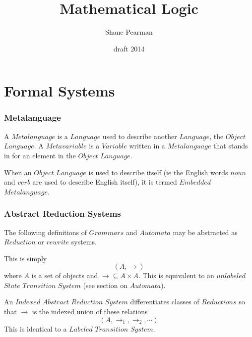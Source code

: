 \documentclass{article}
\begin{document}
\setcounter{secnumdepth}{5}
\setcounter{tocdepth}{5}


\title{Mathematical Logic}
\date{draft 2014}
\author{Shane Pearman}
\maketitle


\tableofcontents

\part{Formal Systems}


\section{Metalanguage}

A $Metalanguage$ is a $Language$ used to describe another $Language$,
the $Object$ $Language$. A $Metavariable$ is a $Variable$ written in a
$Metalanguage$ that stands in for an element in the $Object$
$Language$.

When an $Object$ $Language$ is used to describe itself (ie
the English words $noun$ and $verb$ are used to describe English
itself), it is termed $Embedded$ $Metalanguage$.


\section{Abstract Reduction Systems}
The following definitions of $Grammars$ and $Automata$ may be
abstracted as $Reduction$ or $rewrite$ systems.

This is simply
    \[(A,\rightarrow)\]
where $A$ is a set of objects and $\rightarrow \subseteq A \times
A$. This is equivalent to an $unlabeled$ $State$ $Transition$ $System$
(see section on $Automata$).

An $Indexed$ $Abstract$ $Reduction$ $System$ differentiates classes of
$Reductions$ so that $\rightarrow$ is the indexed union of these
relations
    \[(A, \rightarrow_1, \rightarrow_2, \cdots)\]
This is identical to a $Labeled$ $Transition$ $System$.
\end{document}
